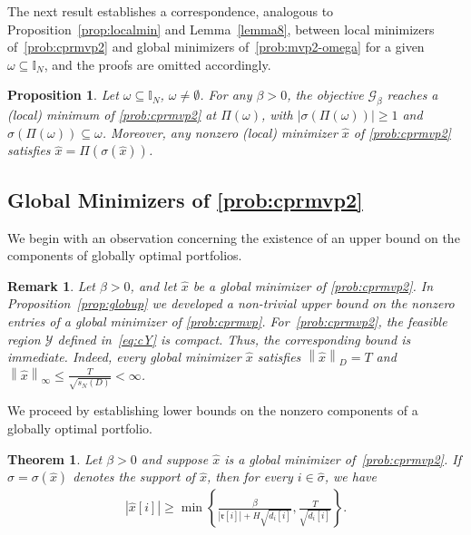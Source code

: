 \documentclass[11pt]{article}
\theoremstyle{plain}
\newtheorem{theorem}{Theorem}
\newtheorem{proposition}{Proposition}
\theoremstyle{definition}
\theoremstyle{plain}
\newtheorem{remark}{Remark}
\newcommand{\II}{{\mathbb I}}
\newcommand{\norm}[1]{\left\lVert#1\right\rVert}
\newcommand{\abs}[1]{\left\lvert#1\right\rvert}
\newcommand{\cG}{{\mathcal G}}
\newcommand{\ccr}{{\mathfrak r}}
\newcommand{\cY}{{\mathcal Y}}
\begin{document}
The next result establishes a correspondence, analogous to Proposition~\ref{prop:localmin} and Lemma~\ref{lemma8}, between local minimizers of~\eqref{prob:cprmvp2} and global minimizers of~\eqref{prob:mvp2-omega} for a given $\omega \subseteq \II_N$, and the proofs are omitted accordingly.
\begin{proposition}\label{prop:localmin2}
Let $\omega\subseteq\II_N$, $\omega\neq\emptyset$. For any $\beta>0$, the objective $\cG_\beta$ reaches a (local) minimum of \eqref{prob:cprmvp2} at $\Pi(\omega)$, with $|\sigma(\Pi(\omega))|\geq 1$ and $\sigma(\Pi(\omega))\subseteq \omega$.
Moreover, any nonzero (local) minimizer $\hat{x}$ of \eqref{prob:cprmvp2} satisfies $\hat{x}=\Pi(\sigma(\hat{x}))$.
\end{proposition}
\subsection{Global Minimizers of \texorpdfstring{\eqref{prob:cprmvp2}}{P2}}
We begin with an observation concerning the existence of an upper bound on the components of globally optimal portfolios.
\begin{remark}
    Let $\beta>0$, and let $\hat{x}$ be a global minimizer of \eqref{prob:cprmvp2}. In Proposition~\ref{prop:globup} we developed a non-trivial upper bound on the nonzero entries of a global minimizer of \eqref{prob:cprmvp}. For~\eqref{prob:cprmvp2}, the feasible region $\cY$ defined in~\eqref{eq:cY}  is compact. Thus, the corresponding bound is immediate. Indeed, every global minimizer $\hat x$ satisfies $\norm{\hat{x}}_D= T$ and $\norm{\hat{x}}_\infty\leq \frac{T}{\sqrt{s_N(D)}}<\infty$.
\end{remark}
We proceed by establishing lower bounds on the nonzero components of a globally optimal portfolio.
\begin{theorem}\label{thm:globup2}
    Let $\beta>0$ and suppose $\hat{x}$ is a global minimizer of~\eqref{prob:cprmvp2}. If $\hat{\sigma}=\sigma(\hat{x})$ denotes the support of $\hat{x}$, then for every $i\in\hat{\sigma}$, we have
   \begin{align*}
    \abs{\hat{x}[i]}\geq \min\left\{\frac{\beta}{\abs{\ccr[i]}+H\sqrt{d_i[i]}},\frac{T}{\sqrt{d_i[i]}}\right\}.
\end{align*}
\end{theorem}
\end{document}
